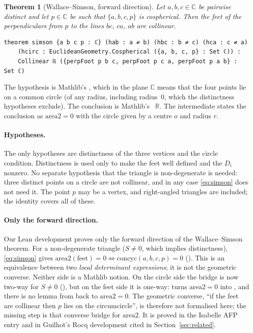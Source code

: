 \documentclass[11pt]{article}
\newtheorem{theorem}{Theorem}
\theoremstyle{definition}
\theoremstyle{remark}
\newcommand{\RR}{\mathbb{R}}
\newcommand{\CC}{\mathbb{C}}
\begin{document}
\begin{theorem}[Wallace--Simson, forward direction]\label{thm:simson}
Let $a,b,c\in\CC$ be pairwise distinct and let $p\in\CC$ be such that $\{a,b,c,p\}$ is
cospherical. Then the feet of the perpendiculars from $p$ to the lines $bc$, $ca$, $ab$ are
collinear.
\end{theorem}

\begin{lstlisting}
theorem simson {a b c p : ℂ} (hab : a ≠ b) (hbc : b ≠ c) (hca : c ≠ a)
    (hcirc : EuclideanGeometry.Cospherical ({a, b, c, p} : Set ℂ)) :
    Collinear ℝ ({perpFoot p b c, perpFoot p c a, perpFoot p a b} : Set ℂ)
\end{lstlisting}

The hypothesis is Mathlib's , which in the plane $\CC$ means
that the four points lie on a common circle (of any radius, including radius~0, which the
distinctness hypotheses exclude). The conclusion is Mathlib's ~$\RR$. The
intermediate  states the conclusion as $\mathrm{area2}=0$ with the
circle given by a centre $o$ and radius $r$.

\paragraph{Hypotheses.} The only hypotheses are distinctness of the three vertices and the circle
condition. Distinctness is used only to make the feet well defined and the $D_i$ nonzero. No
separate hypothesis that the triangle is non-degenerate is needed: three distinct points on a
circle are not collinear, and in any case \eqref{eq:simson} does not need it. The point $p$ may be
a vertex, and right-angled triangles are included; the identity covers all of these.

\paragraph{Only the forward direction.} Our Lean development proves only the forward direction
of the Wallace--Simson theorem. For a non-degenerate triangle ($S\ne0$, which implies
distinctness), \eqref{eq:simson} gives
$\mathrm{area2}(\text{feet})=0\iff\mathrm{concyc}(a,b,c,p)=0$
(). This is an equivalence between two \emph{local
determinant expressions}; it is not the geometric converse. Neither side is a Mathlib notion. On
the circle side the bridge is now two-way for $S\ne0$ (),
but on the feet side it is one-way:  turns
$\mathrm{area2}=0$ into , and there is no lemma from  back to
$\mathrm{area2}=0$. The geometric converse, ``if the feet are collinear then $p$ lies on the
circumcircle'', is therefore not formalised here; the missing step is that converse bridge for
$\mathrm{area2}$. It is proved in the Isabelle AFP entry and in
Guilhot's Rocq development cited in Section~\ref{sec:related}.
\end{document}
